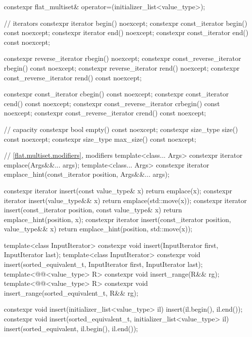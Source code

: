 \begin{codeblock}
{{    constexpr flat_multiset& operator=(initializer_list<value_type>);

    // iterators
    constexpr iterator               begin() noexcept;
    constexpr const_iterator         begin() const noexcept;
    constexpr iterator               end() noexcept;
    constexpr const_iterator         end() const noexcept;

    constexpr reverse_iterator       rbegin() noexcept;
    constexpr const_reverse_iterator rbegin() const noexcept;
    constexpr reverse_iterator       rend() noexcept;
    constexpr const_reverse_iterator rend() const noexcept;

    constexpr const_iterator         cbegin() const noexcept;
    constexpr const_iterator         cend() const noexcept;
    constexpr const_reverse_iterator crbegin() const noexcept;
    constexpr const_reverse_iterator crend() const noexcept;

    // capacity
    constexpr bool empty() const noexcept;
    constexpr size_type size() const noexcept;
    constexpr size_type max_size() const noexcept;

    // \ref{flat.multiset.modifiers}, modifiers
    template<class... Args> constexpr iterator emplace(Args&&... args);
    template<class... Args>
      constexpr iterator emplace_hint(const_iterator position, Args&&... args);

    constexpr iterator insert(const value_type& x)
      { return emplace(x); }
    constexpr iterator insert(value_type&& x)
      { return emplace(std::move(x)); }
    constexpr iterator insert(const_iterator position, const value_type& x)
      { return emplace_hint(position, x); }
    constexpr iterator insert(const_iterator position, value_type&& x)
      { return emplace_hint(position, std::move(x)); }

    template<class InputIterator>
      constexpr void insert(InputIterator first, InputIterator last);
    template<class InputIterator>
      constexpr void insert(sorted_equivalent_t, InputIterator first, InputIterator last);
    template<@@<value_type> R>
      constexpr void insert_range(R&& rg);
    template<@@<value_type> R>
      constexpr void insert_range(sorted_equivalent_t, R&& rg);

    constexpr void insert(initializer_list<value_type> il)
      { insert(il.begin(), il.end()); }
    constexpr void insert(sorted_equivalent_t, initializer_list<value_type> il)
      { insert(sorted_equivalent, il.begin(), il.end()); }

}}
\end{codeblock}
